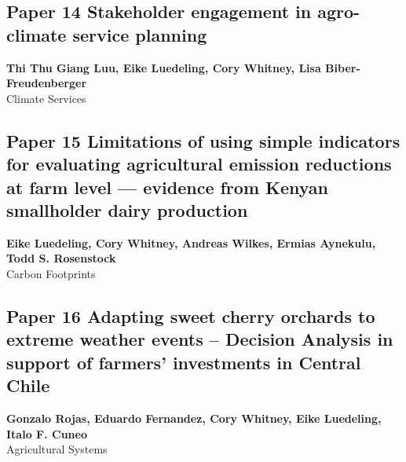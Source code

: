 \documentclass[
]{article}
\begin{document}
\newpage

\hypertarget{luu_stakeholder_2024}{%
\subsection{Paper 14 Stakeholder engagement in agro-climate service
planning}\label{luu_stakeholder_2024}}

\begin{center}
\vspace*{2cm}
{\Large \textbf{Thi Thu Giang Luu, Eike Luedeling, Cory Whitney, Lisa Biber-Freudenberger}} \\[0.5cm]
\vspace*{1cm}
{\Large Climate Services} \\[2cm]
\end{center}


\newpage

\hypertarget{luedeling_limitations_2022}{%
\subsection{Paper 15 Limitations of using simple indicators for
evaluating agricultural emission reductions at farm level --- evidence
from Kenyan smallholder dairy
production}\label{luedeling_limitations_2022}}

\begin{center}
\vspace*{2cm}
{\Large \textbf{Eike Luedeling, Cory Whitney, Andreas Wilkes, Ermias Aynekulu, Todd S. Rosenstock}} \\[0.5cm]
\vspace*{1cm}
{\Large Carbon Footprints} \\[2cm]
\end{center}


\newpage

\hypertarget{rojas_adapting_2021}{%
\subsection{Paper 16 Adapting sweet cherry orchards to extreme weather
events -- Decision Analysis in support of farmers' investments in
Central Chile}\label{rojas_adapting_2021}}

\begin{center}
\vspace*{2cm}
{\Large \textbf{Gonzalo Rojas, Eduardo Fernandez, Cory Whitney, Eike Luedeling, Italo F. Cuneo}} \\[0.5cm]
\vspace*{1cm}
{\Large Agricultural Systems} \\[2cm]
\end{center}

\end{document}
